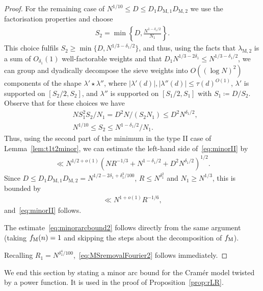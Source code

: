 \documentclass[12pt]{amsart}
\theoremstyle{definition}
\theoremstyle{remark}
\numberwithin{equation}{section}
\newcommand{\1}{\mathbf{1}}
\begin{document}
\begin{proof}
For the remaining case of $N^{1/10}\leq D\leq D_{1}D_{\mathrm{M},1}D_{\mathrm{M},2}$ we use the factorisation properties and choose
\begin{align*}
    S_2=\min\left\{D,\frac{N^{1-\delta_1/2}}{N_1}\right\}.
\end{align*}
This choice fulfils $S_2\geq \min\{D,N^{1/3-\delta_1/2}\}$, and thus, using the facts that $\lambda_{\mathrm{M},2}$ is a sum of $O_{\delta_1}(1)$ well-factorable weights and that $D_{1}N^{1/3-2\delta_1}\leq N^{1/3-\delta_1/2}$, we can group and dyadically decompose the sieve weights into $O((\log N)^2)$ components of the shape $\lambda' \star \lambda''$,
where $|\lambda'(d)|,|\lambda''(d)|\leq \tau(d)^{O(1)}$, $\lambda'$ is supported on $[S_2/2,S_2]$, and $\lambda''$ is supported on $[S_1/2,S_1]$ with $S_1\coloneqq D/S_2$. Observe that for these choices we have
\begin{align*}
    &N S_1^2 S_2/N_1= D^2  N / (S_2N_1)\leq D^2 N^{\delta_1/2}, \\
   & N^{1/10} \leq S_2  \leq N^{1-\delta_1/2}/N_1. 
\end{align*}
Thus, using the second part of the minimum in the type II case of Lemma~\ref{lem:t1t2minor}, we can estimate the left-hand side of~\eqref{eq:minorII}  by
\begin{align*}
    \ll N^{1/2+o(1)} \left(NR^{-1/3}+N^{1-\delta_1/2}+D^2 N^{\delta_1/2}\right)^{1/2}.
\end{align*}
 Since $D\leq  D_{1}D_{\mathrm{M},1}D_{\mathrm{M},2}=N^{1/2-2\delta_1+\delta_1^3/100}$, $R\leq N^{\delta_1^2}$ and $N_1\geq N^{1/3}$, this is bounded by
\begin{align*}
    \ll N^{1+o(1)}R^{-1/6},
\end{align*}
and~\eqref{eq:minorII} follows.

The estimate~\eqref{eq:minorarcbound2} follows directly from the same argument (taking $f_{\textup{M}}(n)=1$ and skipping the steps about the decomposition of $f_{\textup{M}}$).


Recalling $R_1=N^{\delta_1^4/100}$,~\eqref{eq:MSremovalFourier2} follows immediately.
\end{proof}

We end this section by stating a minor arc bound for the Cram\'er model twisted by a power function. It is used in the proof of Proposition~\ref{prop:rLR}.
\end{document}
